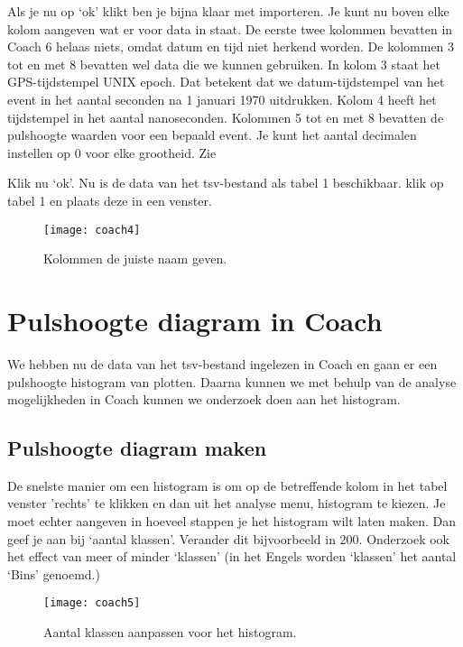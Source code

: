 Als je nu op `ok' klikt ben je bijna klaar met importeren. Je kunt nu boven elke
kolom aangeven wat er voor data in staat. De eerste twee kolommen bevatten in Coach 6
helaas niets, omdat datum en tijd niet herkend worden. De kolommen 3 tot en met
8 bevatten wel data die we kunnen gebruiken. In kolom 3 staat het GPS-tijdstempel UNIX epoch.
Dat betekent dat we datum-tijdstempel van het event in het aantal seconden na 1 januari 1970 uitdrukken.
Kolom 4 heeft het tijdstempel in het aantal nanoseconden.
Kolommen 5 tot en met 8 bevatten de pulshoogte waarden voor een bepaald event.
Je kunt het aantal decimalen instellen op 0 voor elke grootheid. Zie 

Klik nu `ok'. Nu is de data van het tsv-bestand als tabel 1 beschikbaar.
klik op tabel 1 en plaats deze in een venster.

\begin{figure}
    \centering
    \texttt{[image: coach4]}
    \caption{Kolommen de juiste naam geven.}
    \label{fig:coach4}
\end{figure}


\section{Pulshoogte diagram in Coach}

We hebben nu de data van het tsv-bestand ingelezen in Coach en gaan er een
pulshoogte histogram van plotten. Daarna kunnen we met behulp van de analyse
mogelijkheden in Coach kunnen we onderzoek doen aan het histogram.

\subsection{Pulshoogte diagram maken}

De snelste manier om een histogram is om op de betreffende kolom in het tabel venster
'rechts' te klikken en dan uit het analyse menu, histogram te kiezen.
Je moet echter aangeven in hoeveel stappen je het histogram wilt laten maken.
Dan geef je aan bij `aantal klassen'. Verander dit bijvoorbeeld in 200. Onderzoek
ook het effect van meer of minder `klassen' (in het Engels worden `klassen' het aantal
`Bins' genoemd.)

\begin{figure}
    \centering
    \texttt{[image: coach5]}
    \caption{Aantal klassen aanpassen voor het histogram.}
    \label{fig:coach5}
\end{figure}

